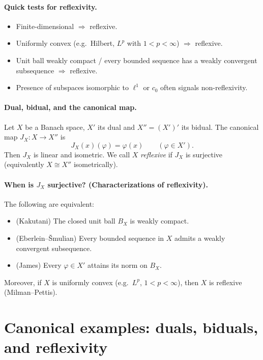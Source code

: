 \documentclass[12pt,a4paper]{article}
\theoremstyle{plain}
\theoremstyle{definition}
\theoremstyle{remark}
\theoremstyle{remark}
\theoremstyle{definition}
\begin{document}
	\paragraph{Quick tests for reflexivity.}
	\begin{itemize}
		\item Finite-dimensional $\Rightarrow$ reflexive.
		\item Uniformly convex (e.g.\ Hilbert, $L^p$ with $1<p<\infty$) $\Rightarrow$ reflexive.
		\item Unit ball weakly compact / every bounded sequence has a weakly convergent subsequence $\Rightarrow$ reflexive.
		\item Presence of subspaces isomorphic to $\ell^1$ or $c_0$ often signals non-reflexivity.
	\end{itemize}
	
	
	\paragraph{Dual, bidual, and the canonical map.}
	Let $X$ be a Banach space, $X'$ its dual and $X''=(X')'$ its bidual.
	The canonical map $J_X:X\to X''$ is
	\[
	J_X(x)(\varphi)=\varphi(x)\qquad(\varphi\in X').
	\]
	Then $J_X$ is linear and isometric. We call $X$ \emph{reflexive} if $J_X$ is surjective
	(equivalently $X\cong X''$ isometrically).
	
	\paragraph{When is $J_X$ surjective? (Characterizations of reflexivity).}
	The following are equivalent:
	\begin{itemize}
		\item (Kakutani) The closed unit ball $B_X$ is weakly compact.
		\item (Eberlein--\v{S}mulian) Every bounded sequence in $X$ admits a weakly convergent subsequence.
		\item (James) Every $\varphi\in X'$ attains its norm on $B_X$.
	\end{itemize}
	Moreover, if $X$ is uniformly convex (e.g.\ $L^p$, $1<p<\infty$), then $X$ is reflexive (Milman--Pettis).
	
\section*{Canonical examples: duals, biduals, and reflexivity}

\end{document}
